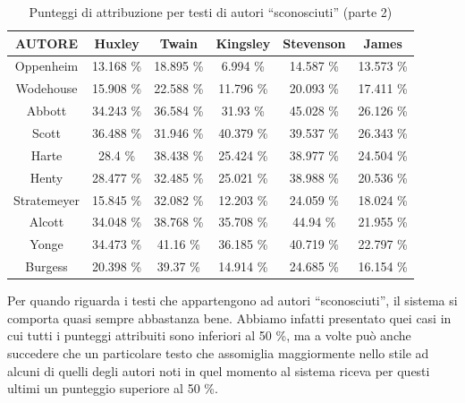 \documentclass[titlepage]{article}
\begin{document}
\begin{table}[htp]
\centering
\footnotesize
\begin{tabular}{cccccc}
    \toprule
    \textbf{AUTORE} & \textbf{Huxley} & \textbf{Twain} & \textbf{Kingsley} & \textbf{Stevenson} & \textbf{James} \\
    
    \midrule
    Oppenheim & 13.168 \% & 18.895 \% & 6.994 \% & 14.587 \% & 13.573 \% \\
    
    \midrule
    Wodehouse & 15.908 \% & 22.588 \% & 11.796 \% & 20.093 \% & 17.411 \% \\
    
    \midrule
    Abbott & 34.243 \% & 36.584 \% & 31.93 \% & 45.028 \% & 26.126 \% \\
    
    \midrule
    Scott & 36.488 \% & 31.946 \% & 40.379 \% & 39.537 \% & 26.343 \% \\
    
    \midrule
    Harte & 28.4 \% & 38.438 \% & 25.424 \% & 38.977 \% & 24.504 \% \\
    
    \midrule
    Henty & 28.477 \% & 32.485 \% & 25.021 \% & 38.988 \% & 20.536 \% \\
    
    \midrule
    Stratemeyer & 15.845 \% & 32.082 \% & 12.203 \% & 24.059 \% & 18.024 \% \\
    
    \midrule
    Alcott & 34.048 \% & 38.768 \% & 35.708 \% & 44.94 \% & 21.955 \% \\
    
    \midrule
    Yonge & 34.473 \% & 41.16 \% & 36.185 \% & 40.719 \% & 22.797 \% \\
    
    \midrule
    Burgess & 20.398 \% & 39.37 \% & 14.914 \% & 24.685 \% & 16.154 \% \\
    
    \bottomrule
\end{tabular}
\caption{Punteggi di attribuzione per testi di autori ``sconosciuti'' (parte 2)}
\end{table}

\noindent
Per quando riguarda i testi che appartengono ad autori ``sconosciuti'', il sistema si comporta quasi sempre abbastanza bene. Abbiamo infatti presentato quei casi in cui tutti i punteggi attribuiti sono inferiori al 50 \%, ma a volte può anche succedere che un particolare testo che assomiglia maggiormente nello stile ad alcuni di quelli degli autori noti in quel momento al sistema riceva per questi ultimi un punteggio superiore al 50 \%.
\end{document}
